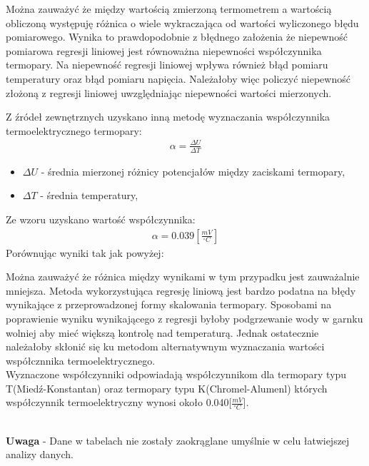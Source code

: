 \documentclass[11pt]{article}
\begin{document}
    \indent Można zauważyć że między wartością zmierzoną termometrem a wartością obliczoną
    występuję różnica o wiele wykraczająca od wartości wyliczonego błędu pomiarowego.
    Wynika to prawdopodobnie z błędnego założenia że niepewność pomiarowa regresji liniowej jest równoważna niepewności
    współczynnika termopary. Na niepewność regresji liniowej wpływa również błąd pomiaru temperatury oraz błąd pomiaru napięcia.
    Należałoby więc policzyć niepewność złożoną z regresji liniowej uwzględniając niepewności wartości mierzonych.\\

    \newpage

    \indent Z źródeł zewnętrznych uzyskano inną metodę wyznaczania współczynnika termoelektrycznego termopary:
    \begin{gather*}
        \alpha=\frac{\Delta U}{\Delta T}
    \end{gather*}
    {\footnotesize
        \begin{itemize}
            \item[] $\Delta U$ - średnia mierzonej różnicy potencjałów między zaciskami termopary,
            \item[] $\Delta T$ - średnia temperatury,
        \end{itemize}}
    \noindent Ze wzoru uzyskano wartość współczynnika:
    \begin{gather*}
        \alpha=0.039[\frac{mV}{^\circ C}]
    \end{gather*}
    \noindent Porównując wyniki tak jak powyżej:
    \begin{center}
    \end{center}
    Można zauważyć że różnica między wynikami w tym przypadku jest zauważalnie mniejsza.
    \indent Metoda wykorzystująca regresję liniową jest bardzo podatna na błędy wynikające z przeprowadzonej formy skalowania termopary.
    Sposobami na poprawienie wyniku wynikającego z regresji byłoby podgrzewanie wody w garnku wolniej aby mieć większą kontrolę nad temperaturą.
    Jednak ostatecznie należałoby skłonić się ku metodom alternatywnym wyznaczania wartości współcznnika termoelektrycznego.\\
    \indent Wyznaczone współczynniki odpowiadają współczynnikom dla termopary typu T(Miedź-Konstantan) oraz termopary typu K(Chromel-Alumenl) których współczynnik
    termoelektryczny wynosi około 0.040[$\frac{mV}{^\circ C}$].\\\\
    \begin{center}
        \small \textbf{Uwaga} - Dane w tabelach nie zostały zaokrąglane umyślnie w celu łatwiejszej analizy danych.
    \end{center}
\end{document}
